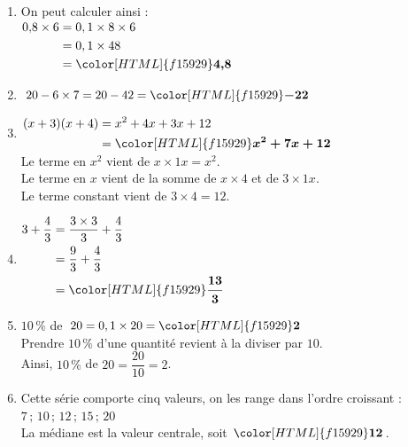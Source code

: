 \documentclass[a4paper,11pt,landscape,exos]{nsi} %
\begin{document}
\begin{multicols}{2}
\maketitle

\begin{enumerate}[]

    \item On peut calculer ainsi : \\
    $\begin{aligned}
    0{,}8\times6&=0,1\times 8\times6\\
    &=0,1\times 48\\
    &={\color[HTML]{f15929}\boldsymbol{4{,}8}}
    \end{aligned}$
\item $20-6\times7=20-42={\color[HTML]{f15929}\boldsymbol{-22}}$
\item $\begin{aligned}
      (x+3)(x+4)&=x^2+4x+3x+12\\
      &={\color[HTML]{f15929}\boldsymbol{x^2+7x+12}}
      \end{aligned}$\\Le terme en $x^2$ vient de $x\times 1x=x^2$.\\Le terme en $x$ vient de la somme de $x \times 4$ et de $3 \times 1x$.\\Le terme constant vient de $3\times 4= 12$.
\item $\begin{aligned}
      3+\dfrac{4}{3} &= \dfrac{3 \times 3}{3} + \dfrac{4}{3} \\
      &= \dfrac{9}{3} + \dfrac{4}{3}\\
      &  ={\color[HTML]{f15929}\boldsymbol{\dfrac{13}{3}}}
      \end{aligned}$
\item $10\,\%$ de $20 = 0,1 \times 20={\color[HTML]{f15929}\boldsymbol{2}}$\\ Prendre $10\,\%$  d'une quantité revient à la diviser par $10$.\\
      Ainsi, $10\,\%$ de $20 = \dfrac{20}{10}=2$.
\item Cette série comporte cinq valeurs, on les range dans l'ordre croissant :\\
      $7\,;\,10\,;\,12\,;\,15\,;\,20$\\
      La médiane est la valeur centrale, soit ${\color[HTML]{f15929}\boldsymbol{12}}$.


\end{enumerate}
\end{multicols}
\end{document}
